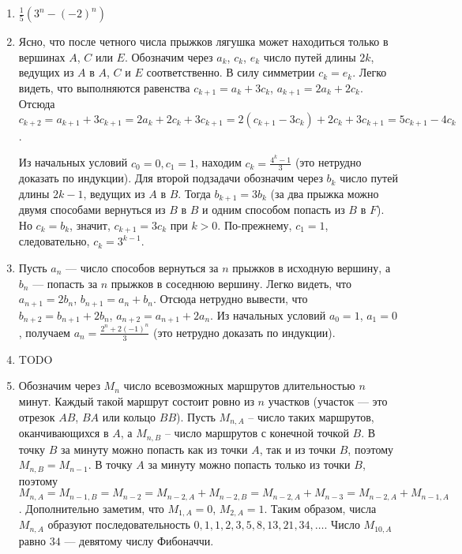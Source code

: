 \documentclass[14pt,openany]{book}
\begin{document}
\begin{enumerate}
\item $\frac{1}{5}(3^n-(-2)^n)$

\item Ясно, что после четного числа прыжков лягушка может находиться только в вершинах $A$, $C$ или $E$. Обозначим через $a_k$, $c_k$, $e_k$ число путей длины $2k$, ведущих из $A$ в $A$, $C$ и $E$ соответственно. В силу симметрии  $c_k = e_k$.  Легко видеть, что выполняются равенства
      $c_{k+1} = a_k + 3c_k$, $a_{k+1} = 2a_k + 2c_k$.
   Отсюда
      $c_{k+2} = a_{k+1} + 3c_{k+1} = 2a_k + 2c_k + 3c_{k+1} = 2(c_{k+1} - 3c_k) + 2c_k + 3c_{k+1} = 5c_{k+1} - 4c_k$.

   Из начальных условий $c_0 = 0,  c_1 = 1$,   находим $c_k = \frac{4^k - 1}{3}$ (это нетрудно доказать по индукции).
   Для второй подзадачи обозначим через $b_k$ число путей длины  $2k - 1$,  ведущих из $A$ в $B$. Тогда   $b_{k+1} = 3b_k$  (за два прыжка можно двумя способами вернуться из $B$ в $B$ и одним способом попасть из $B$ в $F$). Но $c_k = b_k$,   значит,
$c_{k+1} = 3c_k$  при  $k > 0$.  По-прежнему,  $c_1 = 1$,  следовательно, $c_k = 3^{k-1}$.

\item    Пусть $a_n$ --- число способов вернуться за $n$ прыжков в исходную вершину, а $b_n$ --- попасть за $n$ прыжков в соседнюю вершину.
Легко видеть, что   $a_{n+1} = 2b_n$,  $b_{n+1} = a_n + b_n$.   Отсюда нетрудно вывести, что   $b_{n+2} = b_{n+1} + 2b_n$,  $a_{n+2} = a_{n+1} + 2a_n$.
   Из начальных условий $a_0 = 1$, $a_1 = 0$,   получаем $a_n = \frac{2^n + 2(-1)^n}{3}$ (это нетрудно доказать по индукции).

\item TODO

\item   Обозначим через $M_n$ число всевозможных маршрутов длительностью $n$ минут. Каждый такой маршрут состоит ровно из $n$ участков (участок –-- это отрезок $AB$, $BA$ или кольцо $BB$). Пусть  $M_{n,A}$ – число таких маршрутов, оканчивающихся в $A$, а $M_{n,B}$ – число маршрутов с конечной точкой $B$.
  В точку $B$ за минуту можно попасть как из точки $A$, так и из точки $B$, поэтому  $M_{n,B} = M_{n-1}$.
  В точку $A$ за минуту можно попасть только из точки $B$, поэтому  $M_{n,A} = M_{n-1,B} = M_{n-2} = M_{n-2,A} + M_{n-2,B} = M_{n-2,A} + M_{n-3} = M_{n-2,A} + M_{n-1,A}$. 
  Дополнительно заметим, что  $M_{1,A} = 0$, $M_{2,A} = 1$.  Таким образом, числа $M_{n,A}$ образуют последовательность  $0, 1, 1, 2, 3, 5, 8, 13, 21, 34, \ldots$.
  Число $M_{10,A}$ равно $34$ --- девятому числу Фибоначчи.


\end{enumerate}
\end{document}
